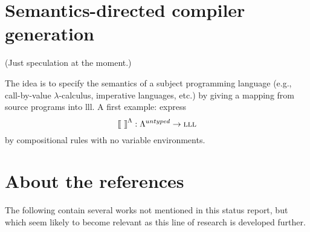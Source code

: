 \documentclass{llncs}
\begin{document}
\section{Semantics-directed compiler generation}

(Just speculation at the moment.)

The idea is to specify the semantics of a subject programming language (e.g., call-by-value $\lambda$-calculus, imperative languages, etc.) by giving a mapping from source programs into {\sc lll}. A first example: express
$$
\mbox{$\lbrack\hspace{-0.3ex}\lbrack$}\ \mbox{$\rbrack\hspace{-0.3ex}\rbrack$}^\Lambda : \Lambda^{untyped} \to \mbox{\sc lll}
$$ by compositional rules with no variable environments.



\section{About the references} 

The following contain several works not mentioned in this status report, but which seem likely to become relevant as this line of research is developed further.






\nocite{*}
\end{document}
